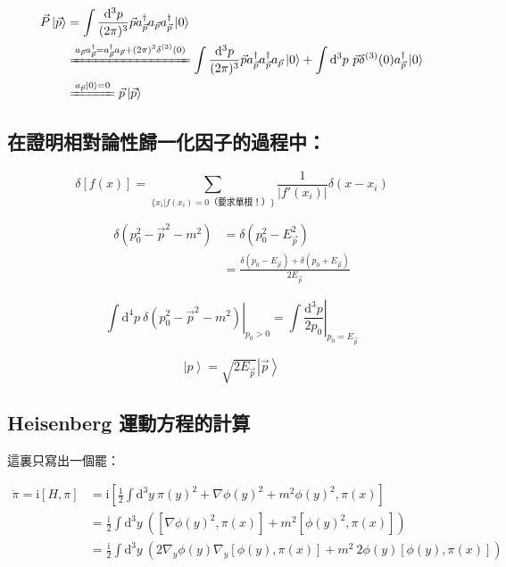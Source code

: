 \documentclass{article}
\begin{document}
$$
\begin{aligned}
\vec{P}\left|\vec{p}\right\rangle & =\int\frac{\mathrm{d}^3p}{(2\pi)^3}\vec{p}a_{\vec{p}}^{\dagger}a_{\vec{p}}a_{\vec{p}}^{\dagger}\left|0\right\rangle                                                                                                                                                                                         \\
& \xlongequal{a_{\vec{p}}a_{\vec{p}}^{\dagger}=a_{\vec{p}}^{\dagger}a_{\vec{p}}+(2\pi)^3\delta^{(3)}(0)}\int\frac{\mathrm{d}^3p}{(2\pi)^3}\vec{p}a_{\vec{p}}^{\dagger}a_{\vec{p}}^{\dagger}a_{\vec{p}}\left|0\right\rangle+\int\mathrm{d}^3p\ \vec{p}\delta^{(3)}(0)a_{\vec{p}}^{\dagger}\left|0\right\rangle \\
& \xlongequal{a_{\vec{p}}\left|0\right\rangle=0}\vec{p}\left|\vec{p}\right\rangle
\end{aligned}$$

\subsection{在證明相對論性歸一化因子的過程中：}

$$\delta[f(x)]=\sum_{\{x_i|f(x_i)=0\text{（要求單根！）}\}}\frac{1}{|f'(x_i)|}\delta(x-x_i)$$

$$
\begin{aligned}
\delta(p_0^2-\vec{p}^2-m^2) & =\delta(p_0^2-E_{\vec{p}}^2)                                          \\
& =\frac{\delta(p_0-E_{\vec{p}})+\delta(p_0+E_{\vec{p}})}{2E_{\vec{p}}}
\end{aligned}$$

$$\left.\int\mathrm{d}^4p\ \delta(p_0^2-\vec{p}^2-m^2)\right|_{p_0>0}=\left.\int\frac{\mathrm{d}^3p}{2p_0}\right|_{p_0=E_{\vec{p}}}$$

$$\left|p\right\rangle=\sqrt{2E_{\vec{p}}}\left|\vec{p}\right\rangle$$

\subsection{Heisenberg 運動方程的計算}

這裏只寫出一個罷：

$$
\begin{aligned}
\dot{\pi}=\mathrm{i}[H,\pi] & =\mathrm{i}\left[\frac{1}{2}\int\mathrm{d}^3y\ \pi(y)^2+\nabla\phi(y)^2+m^2\phi(y)^2,\pi(x)\right]                          \\
& =\frac{\mathrm{i}}{2}\int\mathrm{d}^3y\ \left([\nabla\phi(y)^2,\pi(x)]+m^2[\phi(y)^2,\pi(x)]\right)                         \\
& =\frac{\mathrm{i}}{2}\int\mathrm{d}^3y\ \left(2\nabla_y\phi(y)\nabla_y[\phi(y),\pi(x)]+m^2\ 2\phi(y)[\phi(y),\pi(x)]\right)
\end{aligned}$$
\end{document}
